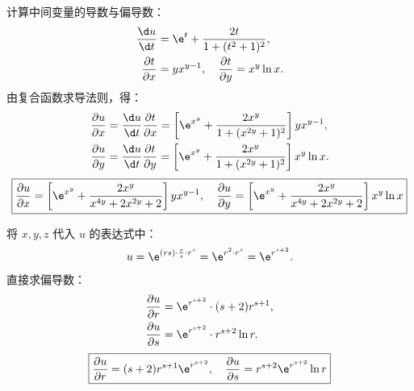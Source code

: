 \begin{solution}

    计算中间变量的导数与偏导数：
    \begin{equation}
        \begin{aligned}
            \frac{\d u}{\d t}             & = \e^t + \frac{2t}{1 + (t^2 + 1)^2},                          \\
            \frac{\partial t}{\partial x} & = y x^{y-1}, \quad \frac{\partial t}{\partial y} = x^y \ln x.
        \end{aligned}
    \end{equation}
    由复合函数求导法则，得：
    \begin{equation}
        \begin{aligned}
            \frac{\partial u}{\partial x} & = \frac{\d u}{\d t} \frac{\partial t}{\partial x} = \left[ \e^{x^y} + \frac{2x^y}{1 + (x^{2y} + 1)^2} \right] y x^{y-1}, \\
            \frac{\partial u}{\partial y} & = \frac{\d u}{\d t} \frac{\partial t}{\partial y} = \left[ \e^{x^y} + \frac{2x^y}{1 + (x^{2y} + 1)^2} \right] x^y \ln x.
        \end{aligned}
    \end{equation}
    \begin{equation}
        \boxed{\frac{\partial u}{\partial x} = \left[ \e^{x^y} + \frac{2x^y}{x^{4y} + 2x^{2y} + 2} \right] y x^{y-1}, \quad \frac{\partial u}{\partial y} = \left[ \e^{x^y} + \frac{2x^y}{x^{4y} + 2x^{2y} + 2} \right] x^y \ln x}
    \end{equation}


    将 $x, y, z$ 代入 $u$ 的表达式中：
    \begin{equation}
        u = \e^{(rs) \cdot \frac{r}{s} \cdot r^s} = \e^{r^2 \cdot r^s} = \e^{r^{s+2}}.
    \end{equation}
    直接求偏导数：
    \begin{equation}
        \begin{aligned}
            \frac{\partial u}{\partial r} & = \e^{r^{s+2}} \cdot (s+2) r^{s+1}, \\
            \frac{\partial u}{\partial s} & = \e^{r^{s+2}} \cdot r^{s+2} \ln r.
        \end{aligned}
    \end{equation}
    \begin{equation}
        \boxed{\frac{\partial u}{\partial r} = (s+2) r^{s+1} \e^{r^{s+2}}, \quad \frac{\partial u}{\partial s} = r^{s+2} \e^{r^{s+2}} \ln r}
    \end{equation}


\end{solution}
